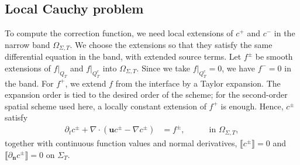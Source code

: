 \documentclass[11pt,reqno]{amsart}
\theoremstyle{plain}
\theoremstyle{definition}
\numberwithin{equation}{section}
\newcommand{\paren}[1]{\left(#1\right)}
\newcommand{\jump}[1]{\llbracket#1\rrbracket}
\newcommand{\at}[2]{\left. #1 \right|_{#2}}
\newcommand{\grad}[1]{\nabla #1}
\newcommand{\bm}[1]{\boldsymbol{#1}}
\begin{document}
\subsection{Local Cauchy problem}
To compute the correction function, we need local extensions of $c^+$ and $c^-$ in the narrow band $\Omega_{\Sigma,T}$. We choose the extensions so that they satisfy the same differential equation in the band, with extended source terms. Let $f^\pm$ be smooth extensions of $\at{f}{Q_T}$ and $\at{f}{Q_T^c}$ into $\Omega_{\Sigma,T}$.
Since we take $\at{f}{Q_T^c}=0$, we have $f^-=0$ in the band. For $f^+$, we extend $f$ from the interface by a Taylor expansion. The expansion order is tied to the desired order of the scheme; for the second-order spatial scheme used here, a locally constant extension of $f^+$ is enough.
Hence, $c^\pm$ satisfy
\begin{equation}
\begin{aligned}
\partial_t c^\pm + \grad\cdot\paren{\bm u c^\pm - \grad c^\pm} &= f^\pm, \quad&&\text{ in }\Omega_{\Sigma,T},
\end{aligned}
\end{equation}
together with continuous function values and normal derivatives, $\jump{c^\pm}=0$ and $\jump{\partial_{\bm n}c^\pm}=0$ on $\Sigma_T$.
\end{document}
